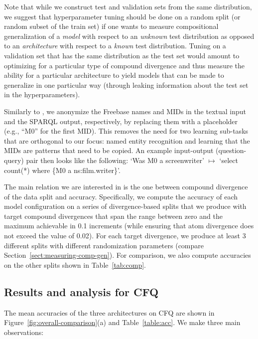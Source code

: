 \documentclass[letterpaper]{article}
\begin{document}
Note that while we construct test and validation sets from the same distribution, we suggest that hyperparameter tuning should be done on a random split (or random subset of the train set) if one wants to measure compositional generalization of a {\em model} with respect to an {\em unknown} test distribution as opposed to an {\em architecture} with respect to a {\em known} test distribution. Tuning on a validation set that has the same distribution as the test set would amount to optimizing for a particular type of compound divergence and thus measure the ability for a particular architecture to yield models that can be made to generalize in one particular way (through leaking information about the test set in the hyperparameters).

Similarly to \citet{ACL2018sql}, we anonymize the Freebase names and MIDs in the textual input and the SPARQL output, respectively, by replacing them with a placeholder (e.g., ``M0'' for the first MID). This removes the need for two learning sub-tasks that are orthogonal to our focus: named entity recognition and learning that the MIDs are patterns that need to be copied. 
An example input-output (question-query) pair then looks like the following: `Was M0 a screenwriter' $\mapsto$ `select count(*) where \{M0 a ns:film.writer\}'.

The main relation we are interested in is the one between compound divergence of the data split and accuracy. Specifically, we compute the accuracy of each model configuration on a series of divergence-based splits that we produce with target compound divergences that span the range between zero and the maximum achievable in 0.1 increments (while ensuring that atom divergence does not exceed the value of 0.02). For each target divergence, we produce at least 3 different splits with different randomization parameters
(compare Section~\ref{sect:measuring-comp-gen}). For comparison, we also compute accuracies on the other splits shown in Table~\ref{tab:comp}.

\subsection{Results and analysis for CFQ}
\label{sect:applying-to-cfq}

The mean accuracies of the three architectures on CFQ are shown in Figure~\ref{fig:overall-comparison}(a) and Table~\ref{table:acc}. We make three main observations:
\end{document}
